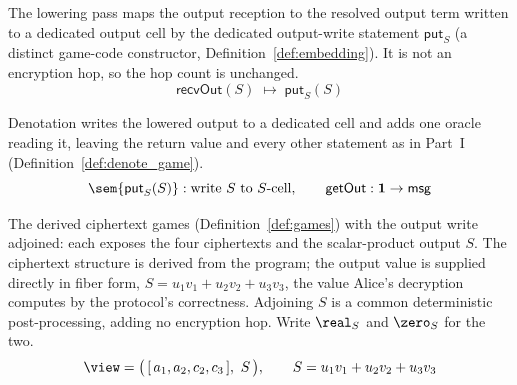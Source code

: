 \begin{definition}
  \label{def:lower_obs_output}
  \rocqok
  The lowering pass maps the output reception to the resolved output term written
  to a dedicated output cell by the dedicated output-write statement
  $\mathsf{put}_S$ (a distinct game-code constructor,
  Definition~\ref{def:embedding}). It is not an encryption hop, so the hop count
  is unchanged.
  \[ \mathsf{recvOut}(S) \;\mapsto\; \mathsf{put}_{S}(S) \]
\end{definition}

\begin{definition}
  \label{def:denote_game_leak_S}
  \rocqok
  Denotation writes the lowered output to a dedicated cell and adds one oracle
  reading it, leaving the return value and every other statement as in Part~I
  (Definition~\ref{def:denote_game}).
  \[ \sem{\mathsf{put}_{S}(S)} : \text{write } S \text{ to } S\text{-cell},
        \qquad \mathsf{getOut} : \mathbf{1} \to \mathsf{msg} \]
\end{definition}

\begin{definition}
  \label{def:games_leak_s}
  \rocqok
  The derived ciphertext games (Definition~\ref{def:games}) with the output write
  adjoined: each exposes the four ciphertexts and the scalar-product output $S$.
  The ciphertext structure is derived from the program; the output value is
  supplied directly in fiber form, $S = u_1 v_1 + u_2 v_2 + u_3 v_3$, the value
  Alice's decryption computes by the protocol's correctness. Adjoining $S$ is a
  common deterministic post-processing, adding no encryption hop. Write $\real_S$
  and $\zero_S$ for the two.
  \[ \view = \big(\,[\,a_1,a_2,c_2,c_3\,],\ S\,\big),\qquad
        S = u_1 v_1 + u_2 v_2 + u_3 v_3 \]
\end{definition}

